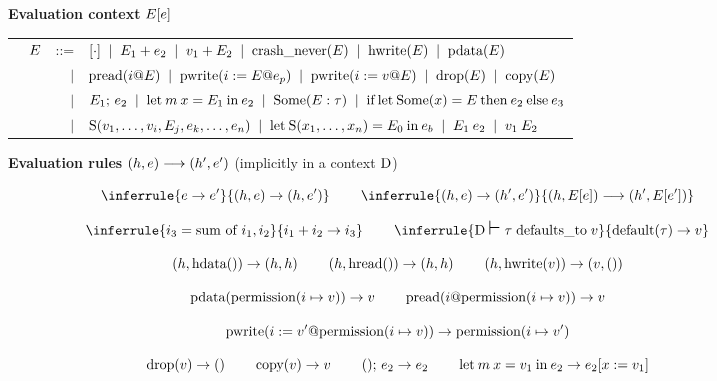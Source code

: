 \ifextended
\begin{figure}
\begin{flushleft}{\bf Evaluation context} $E[e]$\end{flushleft}
{\small

\begin{tabular}{lrrl}
& $ E $ & ::= & $
  [\cdot]
  \;\mid\; E_1 + e_2
  \;\mid\; v_1 + E_2
  \;\mid\; \textrm{crash\_never}(E)
  \;\mid\; \textrm{hwrite}(E)
  \;\mid\; \textrm{pdata}(E)
  $ \\
  & & $ \mid $ & $
  \textrm{pread}(i @ E)
  \;\mid\; \textrm{pwrite}(i := E @ e_p)
  \;\mid\; \textrm{pwrite}(i := v @ E)
  \;\mid\; \textrm{drop}(E)
  \;\mid\; \textrm{copy}(E)
  $ \\
  & & $ \mid $ & $
  E_1;\, e_2
  \;\mid\; \textrm{let}\: m\: x = {E_1}\:\textrm{in}\:{e_2}
  \;\mid\; \textrm{Some}(E: \tau)
  \;\mid\; \textrm{if}\:\textrm{let}\:\textrm{Some}(x) = E\: \textrm{then}\: e_2\: \textrm{else}\: e_3
  $ \\
  & & $ \mid $ & $
  \textrm{S}(v_1,\ldots,v_i,E_j,e_k,\ldots,e_n)
  \;\mid\; \textrm{let}\: \textrm{S}(x_1,\ldots,x_n) = {E_0}\:\textrm{in}\:{e_b}
  \;\mid\; E_1\: e_2
  \;\mid\; v_1\: E_2
  $ \\
\end{tabular}

}
\begin{flushleft}{\bf Evaluation rules} $(h, e) \longrightarrow (h', e')$ (implicitly in a context $\textrm{D}$)\end{flushleft}
{\small

\[
\inferrule{
  \expr\step\expr'
}{
  (\heapval, \expr) \step (\heapval, \expr')
}
\;\;\;\;\;\;\;\;
\inferrule{
  (\heapval, \expr) \step (\heapval', \expr')
}{
  (\heapval, \efill{\expr})\fullstep(\heapval', \efill{\expr'})
}
\]

\[
\inferrule{
  i_3 = \textrm{sum of } i_1, i_2
}{
  i_1 + i_2 \step i_3
}
\;\;\;\;\;\;\;\;
\inferrule{
  \defjudgment{\datadecls}{\typ}{\val}
}{
  \exprdefault{\typ} \step \val
}
\]

\[
(h, \textrm{hdata}()) \rightarrow (h, h)
\;\;\;\;\;\;\;\;
(h, \textrm{hread}()) \rightarrow (h, h)
\;\;\;\;\;\;\;\;
(h, \textrm{hwrite}(v)) \rightarrow (v, ())
\]

\[
\textrm{pdata}(\textrm{permission}(i \mapsto v)) \rightarrow v
\;\;\;\;\;\;\;\;
\textrm{pread}(i @ \textrm{permission}(i \mapsto v)) \rightarrow v
\]

\[
\textrm{pwrite}(i := v' @ \textrm{permission}(i \mapsto v)) \rightarrow \textrm{permission}(i \mapsto v')
\]

\[
\textrm{drop}(v) \rightarrow ()
\;\;\;\;\;\;\;\;
\textrm{copy}(v) \rightarrow v
\;\;\;\;\;\;\;\;
();\, e_2 \rightarrow e_2
\;\;\;\;\;\;\;\;
\textrm{let}\: m\: x = {v_1}\:\textrm{in}\:{e_2} \rightarrow e_2 [ x := v_1 ]
\]

}
\end{figure}
